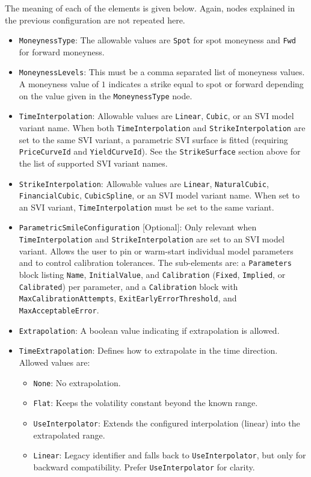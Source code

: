 The meaning of each of the elements is given below. Again, nodes explained in the previous configuration are not repeated here.
\begin{itemize}
\item \lstinline!MoneynessType!:
The allowable values are \lstinline!Spot! for spot moneyness and \lstinline!Fwd! for forward moneyness.

\item \lstinline!MoneynessLevels!:
This must be a comma separated list of moneyness values. A moneyness value of $1$ indicates a strike equal to spot or forward depending on the value given in the \lstinline!MoneynessType! node.

\item \lstinline!TimeInterpolation!:
Allowable values are \lstinline!Linear!, \lstinline!Cubic!, or an SVI model variant name. When both \lstinline!TimeInterpolation! and \lstinline!StrikeInterpolation! are set to the same SVI variant, a parametric SVI surface is fitted (requiring \lstinline!PriceCurveId! and \lstinline!YieldCurveId!). See the \lstinline!StrikeSurface! section above for the list of supported SVI variant names.

\item \lstinline!StrikeInterpolation!:
Allowable values are \lstinline!Linear!, \lstinline!NaturalCubic!, \lstinline!FinancialCubic!, \lstinline!CubicSpline!, or an SVI model variant name. When set to an SVI variant, \lstinline!TimeInterpolation! must be set to the same variant.

\item \lstinline!ParametricSmileConfiguration! [Optional]:
Only relevant when \lstinline!TimeInterpolation! and \lstinline!StrikeInterpolation! are set to an SVI model variant. Allows the user to pin or warm-start individual model parameters and to control calibration tolerances. The sub-elements are: a \lstinline!Parameters! block listing \lstinline!Name!, \lstinline!InitialValue!, and \lstinline!Calibration! (\lstinline!Fixed!, \lstinline!Implied!, or \lstinline!Calibrated!) per parameter, and a \lstinline!Calibration! block with \lstinline!MaxCalibrationAttempts!, \lstinline!ExitEarlyErrorThreshold!, and \lstinline!MaxAcceptableError!.

\item \lstinline!Extrapolation!:
A boolean value indicating if extrapolation is allowed.

\item \lstinline!TimeExtrapolation!:
Defines how to extrapolate in the time direction. Allowed values are:
  \begin{itemize}
    \item \lstinline!None!: No extrapolation.
    \item \lstinline!Flat!: Keeps the volatility constant beyond the known range.
    \item \lstinline!UseInterpolator!: Extends the configured interpolation (linear) into the extrapolated range.
    \item \lstinline!Linear!: Legacy identifier and falls back to \lstinline!UseInterpolator!, but only for backward compatibility. Prefer \lstinline!UseInterpolator! for clarity.
  \end{itemize}


\end{itemize}
